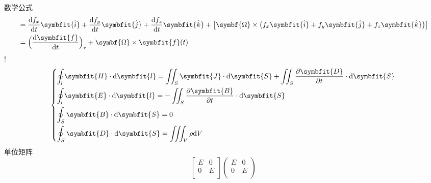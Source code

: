 \documentclass[hyperref,UTF8,11pt,CJK,handout]{beamer}
\begin{document}
\begin{frame}{数学公式}
\begin{equation}
\begin{aligned}
			&= \dfrac{\mathrm{d}f_x}{\mathrm{d}t} \symbfit{\hat{i}} + \dfrac{\mathrm{d}f_y}{\mathrm{d}t} \symbfit{\hat{j}} + \dfrac{\mathrm{d}f_z}{\mathrm{d}t} \symbfit{\hat{k}} + \big[\symbf{\Omega} \times \big( f_x \symbfit{\hat{i}} + f_y \symbfit{\hat{j}} + f_z \symbfit{\hat{k}}\big) \big] \\
			&= \Big(\dfrac{\mathrm{d}\symbfit{f}}{\mathrm{d}t}\Big)_r + \symbf{\Omega} \times \symbfit{f}(t)
			\end{aligned}
		\end{equation}
	!
		\begin{equation}
			\begin{dcases}
			\oint_l \symbfit{H} \cdot \mathrm{d}\symbfit{l} = \iint_S \symbfit{J} \cdot \mathrm{d}\symbfit{S} + \iint_S \dfrac{\partial\symbfit{D}}{\partial t} \cdot \mathrm{d}\symbfit{S} \\
			\oint_l \symbfit{E} \cdot \mathrm{d}\symbfit{l} = - \iint_S \dfrac{\partial\symbfit{B}}{\partial t} \cdot \mathrm{d}\symbfit{S} \\
			\oint_S \symbfit{B} \cdot \mathrm{d}\symbfit{S} = 0 \\
			\oint_S \symbfit{D} \cdot \mathrm{d}\symbfit{S} = \iiint_V \rho \mathrm{d}V
			\end{dcases}
		\end{equation}
	单位矩阵
		\[
		\begin{bmatrix}
		E & 0 \\
		0 & E \\
		\end{bmatrix}
		\begin{pmatrix}
			E & 0 \\
			0 & E \\
		\end{pmatrix}
		\]
\end{frame}
\end{document}

